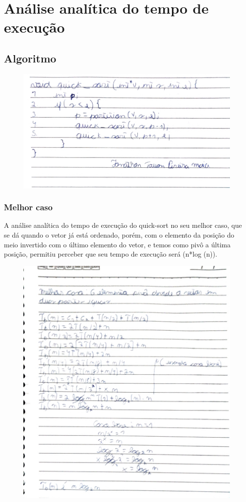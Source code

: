 \newpage

\section{Análise analítica do tempo de execução}
\subsection{Algoritmo}
\begin{figure}[h]
    \centering
    \includegraphics[width=0.76\linewidth]{Imagens/quick.jpg}
\end{figure}

\newpage

\subsubsection{Melhor caso}
A análise analítica do tempo de execução do quick-sort no seu melhor caso, que se dá quando o vetor já está ordenado, porém, com o elemento da posição do meio invertido com o último elemento do vetor, e temos como pivô a última posição, permitiu perceber que seu tempo de execução será (n*log (n)).
\begin{figure}[h]
    \centering
    \includegraphics[width=0.76\linewidth]{Imagens/melhor-quick.jpg}
\end{figure}

